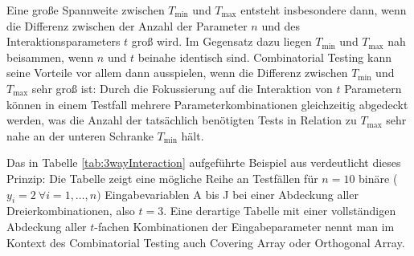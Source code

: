 Eine große Spannweite zwischen $T_{\min}$ und $T_{\max}$ entsteht insbesondere dann, wenn die Differenz zwischen der Anzahl der Parameter $n$ und des Interaktionsparameters $t$ groß wird. Im Gegensatz dazu liegen $T_{\min}$ und $T_{\max}$ nah beisammen, wenn $n$ und $t$ beinahe identisch sind. Combinatorial Testing kann seine Vorteile vor allem dann ausspielen, wenn die Differenz zwischen $T_{\min}$ und $T_{\max}$ sehr groß ist: Durch die Fokussierung auf die Interaktion von $t$ Parametern können in einem Testfall mehrere Parameterkombinationen gleichzeitig abgedeckt werden, was die Anzahl der tatsächlich benötigten Tests in Relation zu $T_{\max}$ sehr nahe an der unteren Schranke $T_{\min}$ hält.

Das in Tabelle \ref{tab:3wayInteraction} aufgeführte Beispiel aus \cite{kuhn2010practical} verdeutlicht dieses Prinzip: Die Tabelle zeigt eine mögliche Reihe an Testfällen für $n=10$ binäre ($y_i = 2 ~ \forall i = 1,\dots,n)$ Eingabevariablen A bis J bei einer Abdeckung aller Dreierkombinationen, also $t = 3$. Eine derartige Tabelle mit einer vollständigen Abdeckung aller $t$-fachen Kombinationen der Eingabeparameter nennt man im Kontext des Combinatorial Testing auch Covering Array oder Orthogonal Array. 

